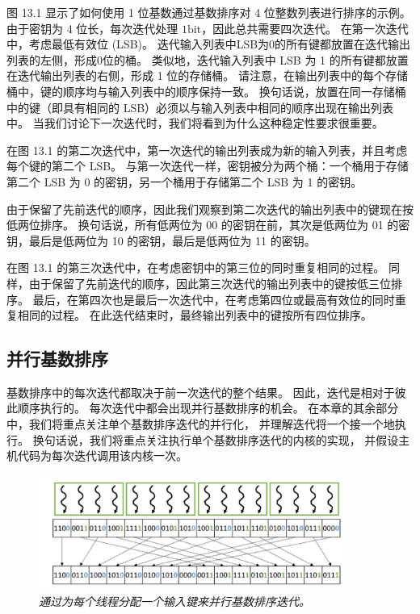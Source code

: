 图 13.1 显示了如何使用 1 位基数通过基数排序对 4 位整数列表进行排序的示例。 
由于密钥为 4 位长，每次迭代处理 $1 \mathrm{bit}$，因此总共需要四次迭代。 在第一次迭代中，考虑最低有效位 (LSB)。 
迭代输入列表中LSB为0的所有键都放置在迭代输出列表的左侧，形成0位的桶。 
类似地，迭代输入列表中 LSB 为 1 的所有键都放置在迭代输出列表的右侧，形成 1 位的存储桶。 
请注意，在输出列表中的每个存储桶中，键的顺序均与输入列表中的顺序保持一致。 
换句话说，放置在同一存储桶中的键（即具有相同的 LSB）必须以与输入列表中相同的顺序出现在输出列表中。 
当我们讨论下一次迭代时，我们将看到为什么这种稳定性要求很重要。

在图 13.1 的第二次迭代中，第一次迭代的输出列表成为新的输入列表，并且考虑每个键的第二个 LSB。 
与第一次迭代一样，密钥被分为两个桶：一个桶用于存储第二个 LSB 为 0 的密钥，另一个桶用于存储第二个 LSB 为 1 的密钥。

由于保留了先前迭代的顺序，因此我们观察到第二次迭代的输出列表中的键现在按低两位排序。 
换句话说，所有低两位为 00 的密钥在前，其次是低两位为 01 的密钥，最后是低两位为 10 的密钥，最后是低两位为 11 的密钥。

在图 13.1 的第三次迭代中，在考虑密钥中的第三位的同时重复相同的过程。 
同样，由于保留了先前迭代的顺序，因此第三次迭代的输出列表中的键按低三位排序。 
最后，在第四次也是最后一次迭代中，在考虑第四位或最高有效位的同时重复相同的过程。 
在此迭代结束时，最终输出列表中的键按所有四位排序。

\subsection{并行基数排序}
基数排序中的每次迭代都取决于前一次迭代的整个结果。 因此，迭代是相对于彼此顺序执行的。 
每次迭代中都会出现并行基数排序的机会。 在本章的其余部分中，我们将重点关注单个基数排序迭代的并行化，
并理解迭代将一个接一个地执行。 换句话说，我们将重点关注执行单个基数排序迭代的内核的实现，
并假设主机代码为每次迭代调用该内核一次。

\begin{figure}[H]
	\centering
	\includegraphics[width=0.9\textwidth]{figs/F13.2.png}
	\caption{\textit{通过为每个线程分配一个输入键来并行基数排序迭代。}}
\end{figure}

